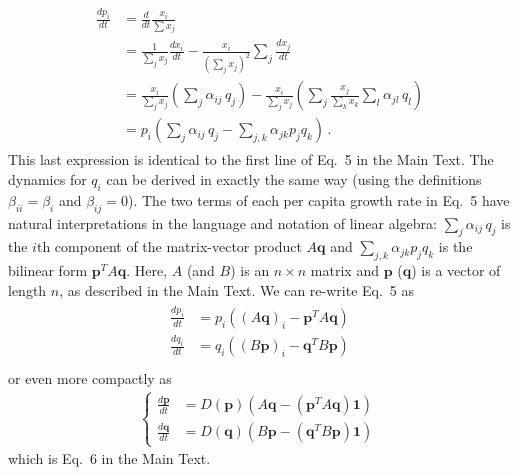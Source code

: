 \documentclass[11pt]{article}
\begin{document}
\begin{align} \label{derive_relative}
\begin{split}
	\frac{dp_i}{dt} &= \frac{d}{dt} \frac{x_i}{\sum x_j}\\  
	&= \frac{1}{\sum_j x_j} \frac{dx_i}{dt} - \frac{x_i}{(\sum_j x_j)^2} \sum_j \frac{dx_j}{dt} \\
	&= \frac{x_i}{\sum_j x_j} \left( \sum_{j} \alpha_{ij} \, q_j \right) - \frac{x_i}{\sum_j x_j} \left(\sum_j \frac{x_j}{\sum_k x_k} \sum_{l} \alpha_{jl} \, q_l \right)\\
	&= p_i \left(\sum_{j} \alpha_{ij} \, q_j -  \sum_{j, k} \alpha_{jk} p_j  q_k \right) \, .
\end{split}
\end{align}
This last expression is identical to the first line of Eq.~5 in the Main Text. The dynamics for $q_i$ can be derived in exactly the same way (using the definitions $\beta_{ii} = \beta_i$ and $\beta_{ij} = 0$). The two terms of each per capita growth rate in Eq.~5 have natural interpretations in the language and notation of linear algebra: $\sum_{j} \alpha_{ij} \, q_j$ is the $i$th component of the matrix-vector product $A \bm{q}$ and $\sum_{j, k} \alpha_{jk} p_j  q_k$ is the bilinear form $\bm{p}^T A \bm{q}$. Here, $A$ (and $B$) is an $n \times n$ matrix and $\bm{p}$ ($\bm{q}$) is a vector of length $n$, as described in the Main Text. We can re-write Eq.~5 as
\begin{align}
\begin{split}
	\frac{dp_i}{dt} &= p_i \left((A \bm{q})_i - \bm{p}^T A \bm{q} \right) \\
	\frac{dq_i}{dt} &= q_i \left((B \bm{p})_i - \bm{q}^T B \bm{p} \right) \\
\end{split}
\end{align}
or even more compactly as
\begin{align}\label{compact_form}
\begin{cases}
\frac{d\bm{p}}{dt} &= D(\bm{p}) \left(A \bm{q} - (\bm{p}^T A \bm{q}) \bm{1} \right) \\
\frac{d\bm{q}}{dt} &= D(\bm{q}) \left(B \bm{p} - (\bm{q}^T B \bm{p}) \bm{1}  \right) \,
\end{cases}
\end{align}
which is Eq.~6 in the Main Text.
\end{document}
